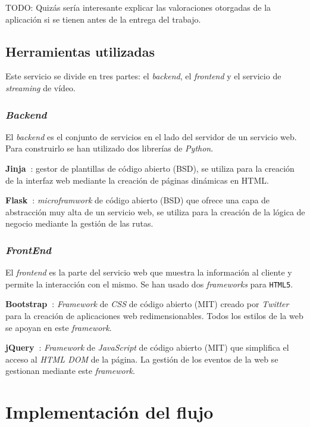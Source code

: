TODO: Quizás sería interesante explicar las valoraciones otorgadas de la aplicación si se tienen antes de la entrega del trabajo. 

\subsection{Herramientas utilizadas}\label{sec:recogidadatos}

Este servicio se divide en tres partes: el \textit{backend}, el \textit{frontend} y el servicio de \textit{streaming} de vídeo.

\subsubsection{\textit{Backend}}

El \textit{backend} es el conjunto de servicios en el lado del servidor de un servicio web. Para construirlo se han utilizado dos librerías de \textit{Python}.

\textbf{Jinja~\cite{tool:jinja}}: gestor de plantillas de código abierto (BSD), se utiliza para la creación de la interfaz web mediante la creación de páginas dinámicas en HTML.

\textbf{Flask~\cite{tool:flask}}: \textit{microframwork} de código abierto (BSD) que ofrece una capa de abstracción muy alta de un servicio web, se utiliza para la creación de la lógica de negocio mediante la gestión de las rutas.

\subsubsection{\textit{FrontEnd}}

El \textit{frontend} es la parte del servicio web que muestra la información al cliente y permite la interacción con el mismo. Se han usado dos \textit{frameworks} para \texttt{HTML5}.

\textbf{Bootstrap~\cite{wiki:boostrap}}: \textit{Framework} de \textit{CSS} de código abierto (MIT) creado por \textit{Twitter} para la creación de aplicaciones web redimensionables. Todos los estilos de la web se apoyan en este \textit{framework}.

\textbf{jQuery~\cite{wiki:jquery}}: \textit{Framework} de \textit{JavaScript} de código abierto (MIT) que simplifica el acceso al \textit{HTML DOM} de la página. La gestión de los eventos de la web se gestionan mediante este \textit{framework}.

\section{Implementación del flujo}

